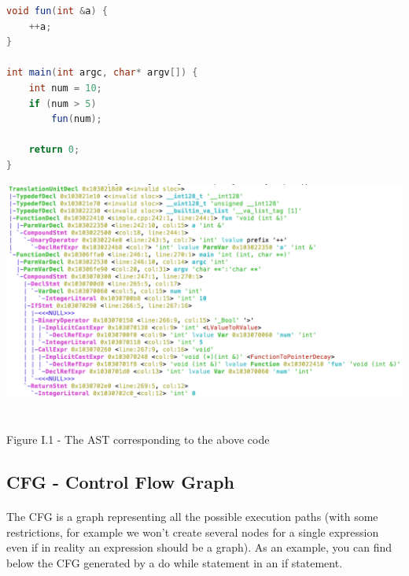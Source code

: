 \documentclass{report}
\begin{document}
\begin{lstlisting}[language=java]
void fun(int &a) {
    ++a;
}

int main(int argc, char* argv[]) {
    int num = 10;
    if (num > 5)
        fun(num);
    
    return 0;
}
\end{lstlisting}
\begin{center}
\includegraphics[scale=0.5]{data/ast.png}
~\\~\\Figure I.1 - The AST corresponding to the above code
\end{center}

\subsection{CFG - Control Flow Graph}

\paragraph{}
\hspace{4mm}\textnormal{The CFG is a graph representing all the possible execution paths (with some restrictions, for example
we won't create several nodes for a single expression even if in reality an expression should be a graph).
As an example, you can find below the CFG generated by a  do while statement in an if statement.}
\end{document}
